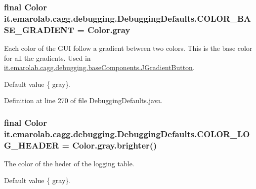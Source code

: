\hypertarget{classit_1_1emarolab_1_1cagg_1_1debugging_1_1DebuggingDefaults_a17491ab8ed655381e8f8cc34e9d3b670}{
\subsubsection[{C\-O\-L\-O\-R\-\_\-\-B\-A\-S\-E\-\_\-\-G\-R\-A\-D\-I\-E\-N\-T}]{\setlength{\rightskip}{0pt plus 5cm}final Color it.\-emarolab.\-cagg.\-debugging.\-Debugging\-Defaults.\-C\-O\-L\-O\-R\-\_\-\-B\-A\-S\-E\-\_\-\-G\-R\-A\-D\-I\-E\-N\-T = Color.\-gray\hspace{0.3cm}{\ttfamily [static]}}}\label{classit_1_1emarolab_1_1cagg_1_1debugging_1_1DebuggingDefaults_a17491ab8ed655381e8f8cc34e9d3b670}
Each color of the G\-U\-I follow a gradient between two colors. This is the base color for all the gradients. Used in \hyperlink{classit_1_1emarolab_1_1cagg_1_1debugging_1_1baseComponents_1_1JGradientButton}{it.\-emarolab.\-cagg.\-debugging.\-base\-Components.\-J\-Gradient\-Button}.\par
 Default value \{ gray\}. 

Definition at line 270 of file Debugging\-Defaults.\-java.

\hypertarget{classit_1_1emarolab_1_1cagg_1_1debugging_1_1DebuggingDefaults_a7b3fec9ea2f75bc8babf48c11e00e669}{
\subsubsection[{C\-O\-L\-O\-R\-\_\-\-L\-O\-G\-\_\-\-H\-E\-A\-D\-E\-R}]{\setlength{\rightskip}{0pt plus 5cm}final Color it.\-emarolab.\-cagg.\-debugging.\-Debugging\-Defaults.\-C\-O\-L\-O\-R\-\_\-\-L\-O\-G\-\_\-\-H\-E\-A\-D\-E\-R = Color.\-gray.\-brighter()\hspace{0.3cm}{\ttfamily [static]}}}\label{classit_1_1emarolab_1_1cagg_1_1debugging_1_1DebuggingDefaults_a7b3fec9ea2f75bc8babf48c11e00e669}
The color of the heder of the logging table. \par
 Default value \{ gray\}. 

